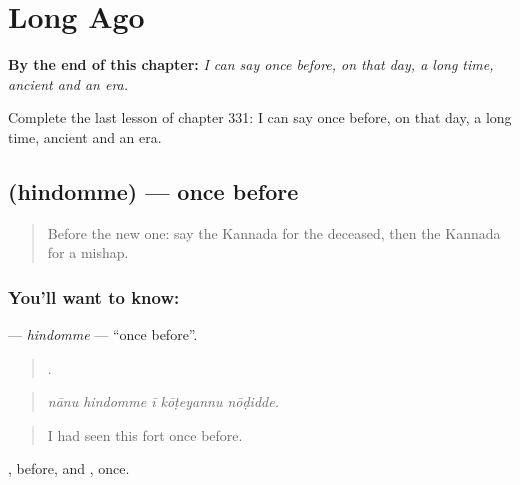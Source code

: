 
\chapter{Long Ago}
\label{ch:ka-long-ago}

\begin{chapteropening}
\textbf{By the end of this chapter:} \emph{I can say once before, on that day, a long time, ancient and an era.}

Complete the last lesson of chapter 331: I can say once before, on that day, a long time, ancient and an era.
\end{chapteropening}

\section[\texorpdfstring{\kn{ಹಿಂದೊಮ್ಮೆ} (hindomme)}{ಹಿಂದೊಮ್ಮೆ (hindomme)}]{ (hindomme) — once before}

\label{lesson:KA-C331-hindomme}



\begin{quote}
Before the new one: say the Kannada for the deceased, then the Kannada for a mishap.
\end{quote}

\subsection*{You'll want to know: }
\textbf{} — \emph{hindomme} — \textquotedblleft{}once before\textquotedblright{}.

\begin{quote}
    .
\end{quote}

\begin{quote}
\emph{nānu hindomme ī kōṭeyannu nōḍidde.}
\end{quote}

\begin{quote}
I had seen this fort once before.
\end{quote}

, before, and , once.

